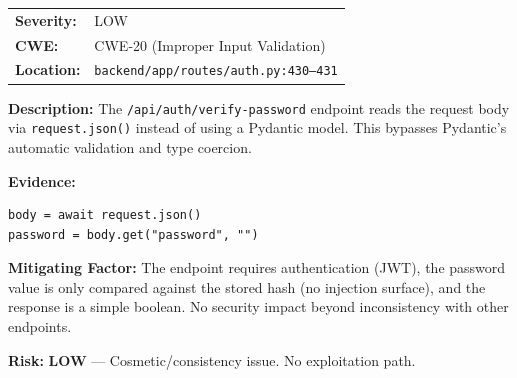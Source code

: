 \documentclass[11pt,a4paper]{article}
\begin{document}
\begin{tcolorbox}[colback=low!5, colframe=low, title=\textbf{S-02: verify-password Endpoint Uses Raw JSON Parsing}]
\begin{tabularx}{\textwidth}{lX}
\textbf{Severity:} & \textcolor{low}{LOW} \\
\textbf{CWE:} & CWE-20 (Improper Input Validation) \\
\textbf{Location:} & \texttt{backend/app/routes/auth.py:430--431} \\
\end{tabularx}

\textbf{Description:} The \texttt{/api/auth/verify-password} endpoint reads the request body via \texttt{request.json()} instead of using a Pydantic model. This bypasses Pydantic's automatic validation and type coercion.

\textbf{Evidence:}
\begin{verbatim}
body = await request.json()
password = body.get("password", "")
\end{verbatim}

\textbf{Mitigating Factor:} The endpoint requires authentication (JWT), the password value is only compared against the stored hash (no injection surface), and the response is a simple boolean. No security impact beyond inconsistency with other endpoints.

\textbf{Risk:} \textcolor{low}{\textbf{LOW}} --- Cosmetic/consistency issue. No exploitation path.
\end{tcolorbox}
\end{document}
